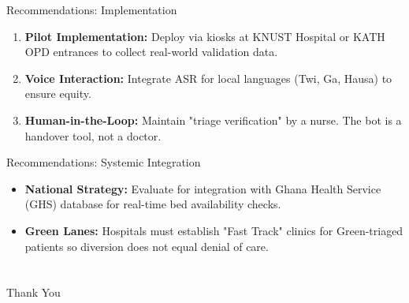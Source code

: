 \documentclass[aspectratio=169,12pt]{beamer}
\begin{document}
	\begin{frame}{Recommendations: Implementation}
		\begin{enumerate}
			\item \textbf{Pilot Implementation:} Deploy via kiosks at KNUST Hospital or KATH OPD entrances to collect real-world validation data.
			\item \textbf{Voice Interaction:} Integrate ASR for local languages (Twi, Ga, Hausa) to ensure equity.
			\item \textbf{Human-in-the-Loop:} Maintain "triage verification" by a nurse. The bot is a handover tool, not a doctor.
		\end{enumerate}
	\end{frame}
	
	\begin{frame}{Recommendations: Systemic Integration}
		\begin{itemize}
			\item \textbf{National Strategy:} Evaluate for integration with Ghana Health Service (GHS) database for real-time bed availability checks.
			\item \textbf{Green Lanes:} Hospitals must establish "Fast Track" clinics for Green-triaged patients so diversion does not equal denial of care.
		\end{itemize}
	\end{frame}
	

	\section*{}
	
	\begin{frame}
		\begin{center}
			{\Huge Thank You}
		\end{center}
	\end{frame}
	
\end{document}

